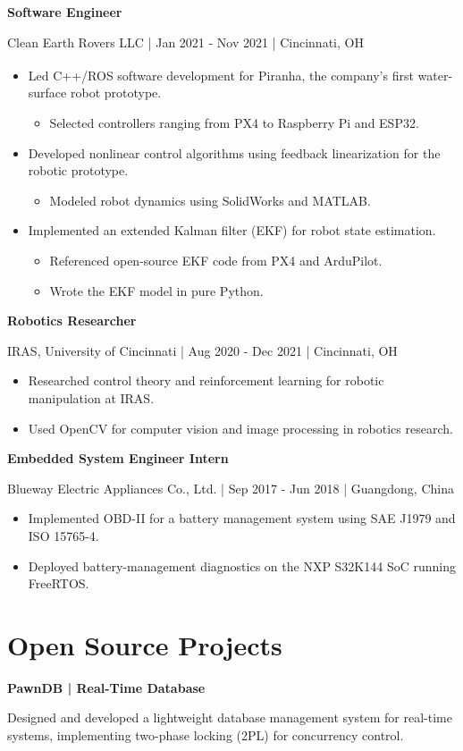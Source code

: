 \documentclass[11pt,a4paper]{article}
\newcommand{\resumejob}[4]{%
  \par\addvspace{7pt}%
  \textbf{#1}\par\nopagebreak
  #2 | #3 | #4\par\nopagebreak
}
\begin{document}
\resumejob{Software Engineer}{Clean Earth Rovers LLC}{Jan 2021 - Nov 2021}{Cincinnati, OH}
\begin{itemize}
  \item Led C++/ROS software development for Piranha\textsuperscript{\textregistered}, the company's first water-surface robot prototype.
  \begin{itemize}
    \item Selected controllers ranging from PX4 to Raspberry Pi and ESP32.
  \end{itemize}
  \item Developed nonlinear control algorithms using feedback linearization for the robotic prototype.
  \begin{itemize}
    \item Modeled robot dynamics using SolidWorks and MATLAB.
  \end{itemize}
  \item Implemented an extended Kalman filter (EKF) for robot state estimation.
  \begin{itemize}
    \item Referenced open-source EKF code from PX4 and ArduPilot.
    \item Wrote the EKF model in pure Python.
  \end{itemize}
\end{itemize}

\resumejob{Robotics Researcher}{IRAS, University of Cincinnati}{Aug 2020 - Dec 2021}{Cincinnati, OH}
\begin{itemize}
  \item Researched control theory and reinforcement learning for robotic manipulation at IRAS.
  \item Used OpenCV for computer vision and image processing in robotics research.
\end{itemize}

\resumejob{Embedded System Engineer Intern}{Blueway Electric Appliances Co., Ltd.}{Sep 2017 - Jun 2018}{Guangdong, China}
\begin{itemize}
  \item Implemented OBD-II for a battery management system using SAE J1979 and ISO 15765-4.
  \item Deployed battery-management diagnostics on the NXP S32K144 SoC running FreeRTOS.
\end{itemize}

\section*{Open Source Projects}
\textbf{PawnDB | Real-Time Database}\par
Designed and developed a lightweight database management system for real-time systems, implementing two-phase locking (2PL) for concurrency control.
\end{document}
